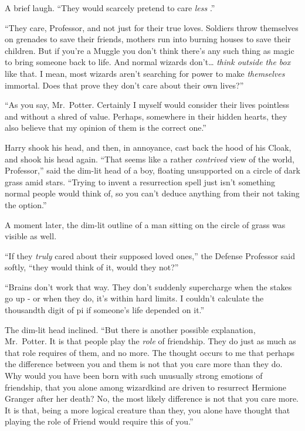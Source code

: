 A brief laugh. ``They would scarcely pretend to care \emph{less} .''

``They care, Professor, and not just for their true loves. Soldiers
throw themselves on grenades to save their friends, mothers run into
burning houses to save their children. But if you're a Muggle you don't
think there's any such thing as magic to bring someone back to life. And
normal wizards don't\ldots{} \emph{think outside the box} like that. I
mean, most wizards aren't searching for power to make \emph{themselves}
immortal. Does that prove they don't care about their own lives?''

``As you say, Mr.~Potter. Certainly I myself would consider their lives
pointless and without a shred of value. Perhaps, somewhere in their
hidden hearts, they also believe that my opinion of them is the correct
one.''

Harry shook his head, and then, in annoyance, cast back the hood of his
Cloak, and shook his head again. ``That seems like a rather
\emph{contrived} view of the world, Professor,'' said the dim-lit head
of a boy, floating unsupported on a circle of dark grass amid stars.
``Trying to invent a resurrection spell just isn't something normal
people would think of, so you can't deduce anything from their not
taking the option.''

A moment later, the dim-lit outline of a man sitting on the circle of
grass was visible as well.

``If they \emph{truly} cared about their supposed loved ones,'' the
Defense Professor said softly, ``they would think of it, would they
not?''

``Brains don't work that way. They don't suddenly supercharge when the
stakes go up - or when they do, it's within hard limits. I couldn't
calculate the thousandth digit of pi if someone's life depended on it.''

The dim-lit head inclined. ``But there is another possible explanation,
Mr.~Potter. It is that people play the \emph{role} of friendship. They
do just as much as that role requires of them, and no more. The thought
occurs to me that perhaps the difference between you and them is not
that you care more than they do. Why would you have been born with such
unusually strong emotions of friendship, that you alone among wizardkind
are driven to resurrect Hermione Granger after her death? No, the most
likely difference is not that you care more. It is that, being a more
logical creature than they, you alone have thought that playing the role
of Friend would require this of you.''

